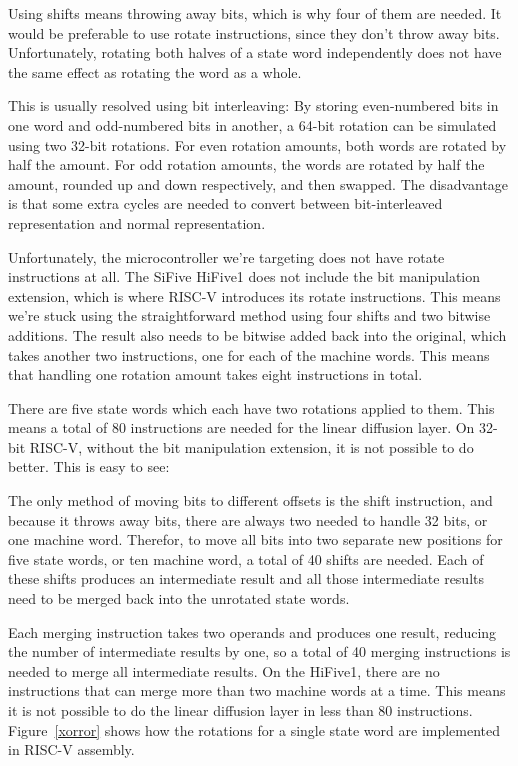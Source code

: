 Using shifts means throwing away bits, which is why four of them are needed. It
would be preferable to use rotate instructions, since they don't throw away
bits. Unfortunately, rotating both halves of a state word independently does not
have the same effect as rotating the word as a whole.

This is usually resolved using bit interleaving: By storing even-numbered bits
in one word and odd-numbered bits in another, a 64-bit rotation can be simulated
using two 32-bit rotations. For even rotation amounts, both words are rotated by
half the amount. For odd rotation amounts, the words are rotated by half the
amount, rounded up and down respectively, and then swapped. The disadvantage is
that some extra cycles are needed to convert between bit-interleaved
representation and normal representation.

Unfortunately, the microcontroller we're targeting does not have rotate
instructions at all. The SiFive HiFive1 does not include the bit manipulation
extension, which is where RISC-V introduces its rotate instructions. This means
we're stuck using the straightforward method using four shifts and two bitwise
additions. The result also needs to be bitwise added back into the original,
which takes another two instructions, one for each of the machine words. This
means that handling one rotation amount takes eight instructions in total.

There are five state words which each have two rotations applied to them. This
means a total of 80 instructions are needed for the linear diffusion layer. On
32-bit RISC-V, without the bit manipulation extension, it is not possible to do
better. This is easy to see:

The only method of moving bits to different offsets is the shift instruction,
and because it throws away bits, there are always two needed to handle 32 bits,
or one machine word. Therefor, to move all bits into two separate new positions
for five state words, or ten machine word, a total of 40 shifts are needed. Each
of these shifts produces an intermediate result and all those intermediate
results need to be merged back into the unrotated state words.

Each merging instruction takes two operands and produces one result, reducing
the number of intermediate results by one, so a total of 40 merging instructions
is needed to merge all intermediate results. On the HiFive1, there are no
instructions that can merge more than two machine words at a time. This means it
is not possible to do the linear diffusion layer in less than 80 instructions.
Figure~\ref{xorror} shows how the rotations for a single state word are
implemented in RISC-V assembly.

